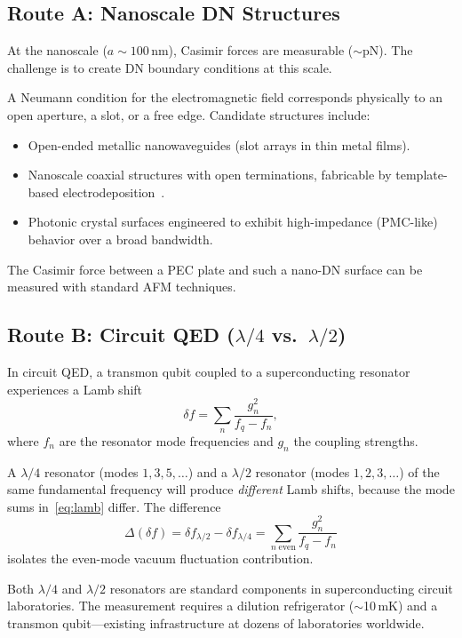 \documentclass[aps,prd,twocolumn,superscriptaddress,nofootinbib]{revtex4-2}
\begin{document}
\subsection{Route A: Nanoscale DN Structures}

At the nanoscale ($a\sim 100$\,nm), Casimir forces are measurable
($\sim$pN).  The challenge is to create DN boundary conditions at
this scale.

A Neumann condition for the electromagnetic field corresponds
physically to an open aperture, a slot, or a free edge.  Candidate
structures include:
\begin{itemize}
\item Open-ended metallic nanowaveguides (slot arrays in thin metal
films).
\item Nanoscale coaxial structures with open terminations,
fabricable by template-based
electrodeposition~\cite{Nanocoax2007}.
\item Photonic crystal surfaces engineered to exhibit
high-impedance (PMC-like) behavior over a broad bandwidth.
\end{itemize}
The Casimir force between a PEC plate and such a nano-DN surface
can be measured with standard AFM techniques.

\subsection{Route B: Circuit QED ($\lambda/4$ vs.\ $\lambda/2$)}

In circuit QED, a transmon qubit coupled to a superconducting
resonator experiences a Lamb shift
\begin{equation}\label{eq:lamb}
  \delta f=\sum_n\frac{g_n^2}{f_q-f_n},
\end{equation}
where $f_n$ are the resonator mode frequencies and $g_n$ the
coupling strengths.

A $\lambda/4$ resonator (modes $1,3,5,\ldots$) and a $\lambda/2$
resonator (modes $1,2,3,\ldots$) of the same fundamental frequency
will produce \emph{different} Lamb shifts, because the mode sums
in~\eqref{eq:lamb} differ.  The difference
\begin{equation}
  \Delta(\delta f)=\delta f_{\lambda/2}-\delta f_{\lambda/4}
  =\sum_{n\;\mathrm{even}}\frac{g_n^2}{f_q-f_n}
\end{equation}
isolates the even-mode vacuum fluctuation contribution.

Both $\lambda/4$ and $\lambda/2$ resonators are standard
components in superconducting circuit laboratories.  The
measurement requires a dilution refrigerator ($\sim$10\,mK) and
a transmon qubit---existing infrastructure at dozens of
laboratories worldwide.
\end{document}
